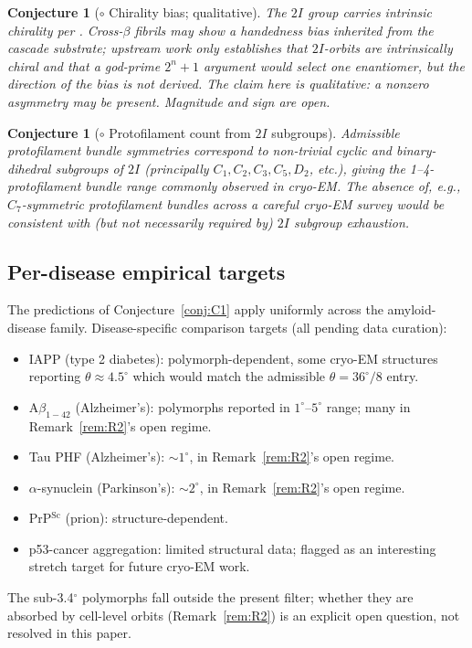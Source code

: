 \documentclass[12pt]{article}
\newtheorem{conjecture}[theorem]{Conjecture}
\begin{document}
\begin{conjecture}[$\circ$ Chirality bias; qualitative]\label{conj:C2}
The $2I$ group carries intrinsic chirality per
\cite[\S 2.7, \S B5]{CascadeBio}. Cross-$\beta$ fibrils may show
a handedness bias inherited from the cascade substrate; upstream
work only establishes that $2I$-orbits are intrinsically chiral
and that a god-prime $2^n + 1$ argument would select one
enantiomer, but the \emph{direction} of the bias is not
derived. The claim here is qualitative: a nonzero asymmetry
may be present. Magnitude and sign are open.
\end{conjecture}

\begin{conjecture}[$\circ$ Protofilament count from $2I$ subgroups]\label{conj:C3}
Admissible protofilament bundle symmetries correspond to
non-trivial cyclic and binary-dihedral subgroups of $2I$
(principally $C_1, C_2, C_3, C_5, D_2$, etc.), giving the
1--4-protofilament bundle range commonly observed in cryo-EM.
The absence of, e.g., $C_7$-symmetric protofilament bundles
across a careful cryo-EM survey would be consistent with (but
not necessarily required by) $2I$ subgroup exhaustion.
\end{conjecture}

\subsection{Per-disease empirical targets}

The predictions of Conjecture~\ref{conj:C1} apply uniformly
across the amyloid-disease family. Disease-specific comparison
targets (all pending data curation):
\begin{itemize}
\item IAPP (type 2 diabetes): polymorph-dependent, some cryo-EM
  structures reporting $\theta \approx 4.5^{\circ}$ which would
  match the admissible $\theta = 36^{\circ}/8$ entry.
\item A$\beta_{1-42}$ (Alzheimer's): polymorphs reported in
  $1^{\circ}$--$5^{\circ}$ range; many in Remark~\ref{rem:R2}'s
  open regime.
\item Tau PHF (Alzheimer's): $\sim 1^{\circ}$, in
  Remark~\ref{rem:R2}'s open regime.
\item $\alpha$-synuclein (Parkinson's): $\sim 2^{\circ}$, in
  Remark~\ref{rem:R2}'s open regime.
\item PrP$^{\mathrm{Sc}}$ (prion): structure-dependent.
\item p53-cancer aggregation: limited structural data; flagged
  as an interesting stretch target for future cryo-EM work.
\end{itemize}
The sub-3.4$^{\circ}$ polymorphs fall outside the present
filter; whether they are absorbed by cell-level orbits
(Remark~\ref{rem:R2}) is an explicit open question, not resolved
in this paper.
\end{document}
